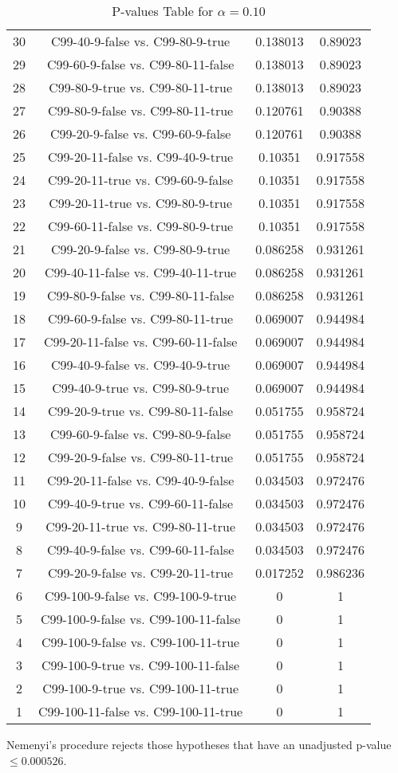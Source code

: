 \documentclass[a4paper,10pt]{article}
\begin{document}
\begin{landscape}
\begin{table}[!htp]
\begin{tabular}{cccc}
30&C99-40-9-false vs. C99-80-9-true&0.138013&0.89023\\
29&C99-60-9-false vs. C99-80-11-false&0.138013&0.89023\\
28&C99-80-9-true vs. C99-80-11-true&0.138013&0.89023\\
27&C99-80-9-false vs. C99-80-11-true&0.120761&0.90388\\
26&C99-20-9-false vs. C99-60-9-false&0.120761&0.90388\\
25&C99-20-11-false vs. C99-40-9-true&0.10351&0.917558\\
24&C99-20-11-true vs. C99-60-9-false&0.10351&0.917558\\
23&C99-20-11-true vs. C99-80-9-true&0.10351&0.917558\\
22&C99-60-11-false vs. C99-80-9-true&0.10351&0.917558\\
21&C99-20-9-false vs. C99-80-9-true&0.086258&0.931261\\
20&C99-40-11-false vs. C99-40-11-true&0.086258&0.931261\\
19&C99-80-9-false vs. C99-80-11-false&0.086258&0.931261\\
18&C99-60-9-false vs. C99-80-11-true&0.069007&0.944984\\
17&C99-20-11-false vs. C99-60-11-false&0.069007&0.944984\\
16&C99-40-9-false vs. C99-40-9-true&0.069007&0.944984\\
15&C99-40-9-true vs. C99-80-9-true&0.069007&0.944984\\
14&C99-20-9-true vs. C99-80-11-false&0.051755&0.958724\\
13&C99-60-9-false vs. C99-80-9-false&0.051755&0.958724\\
12&C99-20-9-false vs. C99-80-11-true&0.051755&0.958724\\
11&C99-20-11-false vs. C99-40-9-false&0.034503&0.972476\\
10&C99-40-9-true vs. C99-60-11-false&0.034503&0.972476\\
9&C99-20-11-true vs. C99-80-11-true&0.034503&0.972476\\
8&C99-40-9-false vs. C99-60-11-false&0.034503&0.972476\\
7&C99-20-9-false vs. C99-20-11-true&0.017252&0.986236\\
6&C99-100-9-false vs. C99-100-9-true&0&1\\
5&C99-100-9-false vs. C99-100-11-false&0&1\\
4&C99-100-9-false vs. C99-100-11-true&0&1\\
3&C99-100-9-true vs. C99-100-11-false&0&1\\
2&C99-100-9-true vs. C99-100-11-true&0&1\\
1&C99-100-11-false vs. C99-100-11-true&0&1\\
\hline
\end{tabular}
\caption{P-values Table for $\alpha=0.10$}
\end{table}Nemenyi's procedure rejects those hypotheses that have an unadjusted p-value $\le0.000526$.


\end{landscape}
\end{document}
